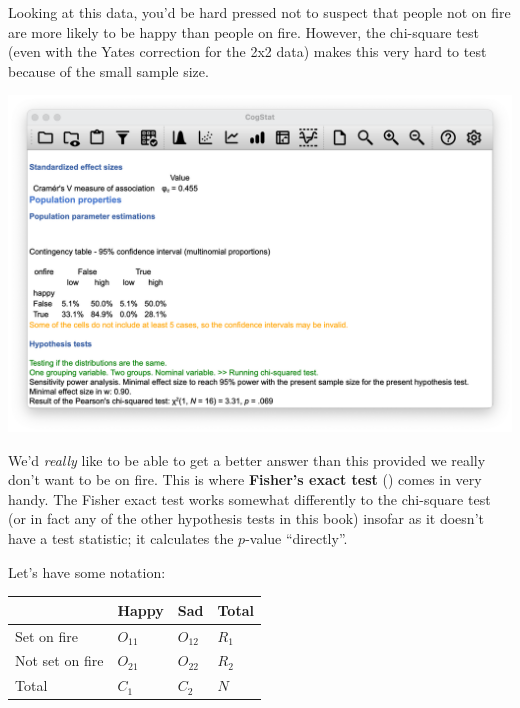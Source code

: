 \documentclass[
  11pt,
  a4paper,
  twoside,symmetric,openright]{book}
\theoremstyle{break}
\theoremstyle{break}
\begin{document}
Looking at this data, you'd be hard pressed not to suspect that people not on fire are more likely to be happy than people on fire. However, the chi-square test (even with the Yates correction for the 2x2 data) makes this very hard to test because of the small sample size.

\begin{center}\includegraphics[width=0.6\linewidth]{resources/image/cogstatsalemresult} \end{center}

We'd \emph{really} like to be able to get a better answer than this provided we really don't want to be on fire. This is where \textbf{Fisher's exact test} () comes in very handy. The Fisher exact test works somewhat differently to the chi-square test (or in fact any of the other hypothesis tests in this book) insofar as it doesn't have a test statistic; it calculates the \(p\)-value ``directly''.

Let's have some notation:

\begin{longtable}[]{@{}llll@{}}
\toprule\noalign{}
& Happy & Sad & Total \\
\midrule\noalign{}
\endhead
\bottomrule\noalign{}
\endlastfoot
Set on fire & \(O_{11}\) & \(O_{12}\) & \(R_{1}\) \\
Not set on fire & \(O_{21}\) & \(O_{22}\) & \(R_{2}\) \\
Total & \(C_{1}\) & \(C_{2}\) & \(N\) \\
\end{longtable}
\end{document}
